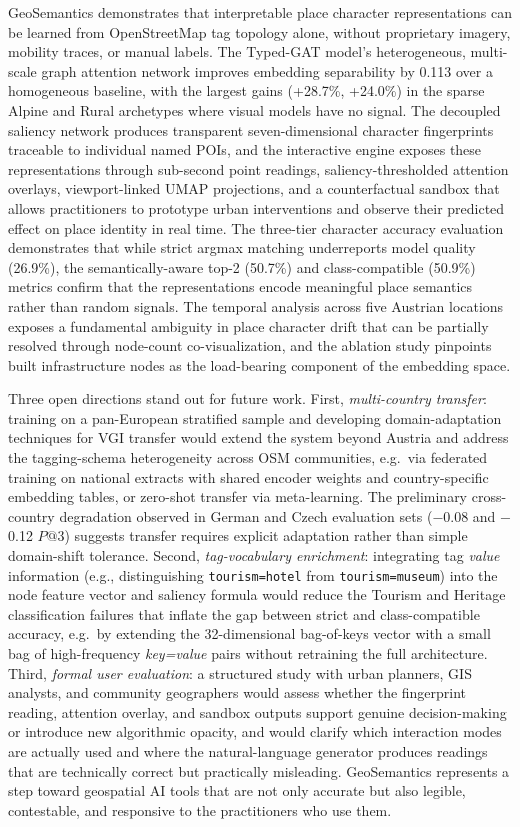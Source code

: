 \documentclass[]{interact}
\theoremstyle{plain}%
\theoremstyle{definition}
\theoremstyle{remark}
\begin{document}
GeoSemantics demonstrates that interpretable place character representations can be learned from OpenStreetMap tag topology alone, without proprietary imagery, mobility traces, or manual labels. The Typed-GAT model's heterogeneous, multi-scale graph attention network improves embedding separability by 0.113 over a homogeneous baseline, with the largest gains (+28.7\%, +24.0\%) in the sparse Alpine and Rural archetypes where visual models have no signal. The decoupled saliency network produces transparent seven-dimensional character fingerprints traceable to individual named POIs, and the interactive engine exposes these representations through sub-second point readings, saliency-thresholded attention overlays, viewport-linked UMAP projections, and a counterfactual sandbox that allows practitioners to prototype urban interventions and observe their predicted effect on place identity in real time. The three-tier character accuracy evaluation demonstrates that while strict argmax matching underreports model quality (26.9\%), the semantically-aware top-2 (50.7\%) and class-compatible (50.9\%) metrics confirm that the representations encode meaningful place semantics rather than random signals. The temporal analysis across five Austrian locations exposes a fundamental ambiguity in place character drift that can be partially resolved through node-count co-visualization, and the ablation study pinpoints built infrastructure nodes as the load-bearing component of the embedding space.

Three open directions stand out for future work. First, \emph{multi-country transfer}: training on a pan-European stratified sample and developing domain-adaptation techniques for VGI transfer would extend the system beyond Austria and address the tagging-schema heterogeneity across OSM communities, e.g.\ via federated training on national extracts with shared encoder weights and country-specific embedding tables, or zero-shot transfer via meta-learning. The preliminary cross-country degradation observed in German and Czech evaluation sets ($-$0.08 and $-$0.12 $P@3$) suggests transfer requires explicit adaptation rather than simple domain-shift tolerance. Second, \emph{tag-vocabulary enrichment}: integrating tag \emph{value} information (e.g., distinguishing \texttt{tourism=hotel} from \texttt{tourism=museum}) into the node feature vector and saliency formula would reduce the Tourism and Heritage classification failures that inflate the gap between strict and class-compatible accuracy, e.g.\ by extending the 32-dimensional bag-of-keys vector with a small bag of high-frequency \emph{key=value} pairs without retraining the full architecture. Third, \emph{formal user evaluation}: a structured study with urban planners, GIS analysts, and community geographers would assess whether the fingerprint reading, attention overlay, and sandbox outputs support genuine decision-making or introduce new algorithmic opacity, and would clarify which interaction modes are actually used and where the natural-language generator produces readings that are technically correct but practically misleading. GeoSemantics represents a step toward geospatial AI tools that are not only accurate but also legible, contestable, and responsive to the practitioners who use them.
\end{document}
